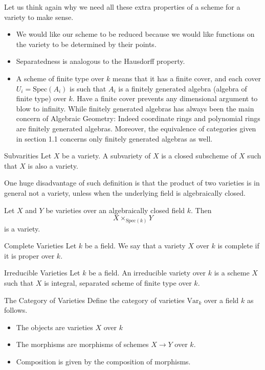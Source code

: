 \documentclass[a4paper]{article}
\begin{document}
Let us think again why we need all these extra properties of a scheme for a variety to make sense. 
\begin{itemize}
\item We would like our scheme to be reduced because we would like functions on the variety to be determined by their points. 
\item Separatedness is analogous to the Hausdorff property. 
\item A scheme of finite type over $k$ means that it has a finite cover, and each cover $U_i=\text{Spec}(A_i)$ is such that $A_i$ is a finitely generated algebra (algebra of finite type) over $k$. Have a finite cover prevents any dimensional argument to blow to infinity. While finitely generated algebras has always been the main concern of Algebraic Geometry: Indeed coordinate rings and polynomial rings are finitely generated algebras. Moreover, the equivalence of categories given in section 1.1 concerns only finitely generated algebras as well. 
\end{itemize}

\begin{defn}{Subvarities}{} Let $X$ be a variety. A subvariety of $X$ is a closed subscheme of $X$ such that $X$ is also a variety. 
\end{defn}

One huge disadvantage of such definition is that the product of two varieties is in general not a variety, unless when the underlying field is algebraically closed. 

\begin{prp}{}{} Let $X$ and $Y$ be varieties over an algebraically closed field $k$. Then $$X\times_{\text{Spec}(k)}Y$$ is a variety. 
\end{prp}

\begin{defn}{Complete Varieties}{} Let $k$ be a field. We say that a variety $X$ over $k$ is complete if it is proper over $k$. 
\end{defn}

\begin{defn}{Irreducible Varieties}{} Let $k$ be a field. An irreducible variety over $k$ is a scheme $X$ such that $X$ is integral, separated scheme of finite type over $k$. 
\end{defn}

\begin{defn}{The Category of Varieties}{} Define the category of varieties $\text{Var}_k$ over a field $k$ as follows. 
\begin{itemize}
\item The objects are varieties $X$ over $k$
\item The morphisms are morphisms of schemes $X\to Y$ over $k$. 
\item Composition is given by the composition of morphisms. 
\end{itemize}
\end{defn}
\end{document}
